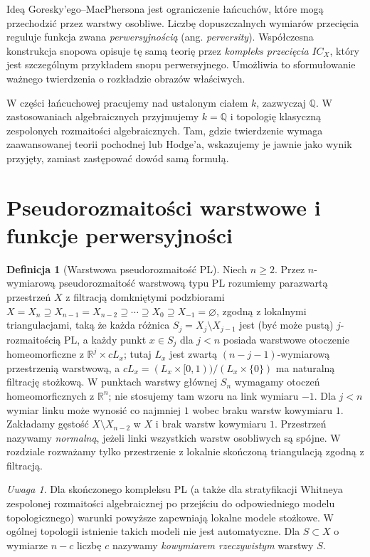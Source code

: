 \documentclass[11pt,a4paper,oneside]{report}
\newcommand{\R}{\mathbb{R}}
\newcommand{\Q}{\mathbb{Q}}
\theoremstyle{plain}
\theoremstyle{definition}
\newtheorem{definicja}[twierdzenie]{Definicja}
\theoremstyle{remark}
\newtheorem{uwaga}[twierdzenie]{Uwaga}
\begin{document}
Ideą Goresky'ego--MacPhersona jest ograniczenie łańcuchów, które
mogą przechodzić przez warstwy osobliwe. Liczbę dopuszczalnych
wymiarów przecięcia reguluje funkcja zwana
\emph{perwersyjnością} (ang. \emph{perversity}).
Współczesna konstrukcja snopowa opisuje tę samą teorię przez
\emph{kompleks przecięcia} $IC_X$, który jest szczególnym
przykładem snopu perwersyjnego. Umożliwia to sformułowanie
ważnego twierdzenia o rozkładzie obrazów właściwych.

W części łańcuchowej pracujemy nad ustalonym ciałem $k$,
zazwyczaj $\Q$. W zastosowaniach algebraicznych
przyjmujemy $k=\Q$ i topologię klasyczną zespolonych
rozmaitości algebraicznych. Tam, gdzie twierdzenie wymaga
zaawansowanej teorii pochodnej lub Hodge'a, wskazujemy je
jawnie jako wynik przyjęty, zamiast zastępować dowód samą
formułą.

\section{Pseudorozmaitości warstwowe i funkcje perwersyjności}
\begin{definicja}[Warstwowa pseudorozmaitość PL]
\label{def:pseudomanifold-xiii}
Niech $n\ge2$. Przez $n$-wymiarową pseudorozmaitość
warstwową typu PL rozumiemy parazwartą przestrzeń $X$
z filtracją domkniętymi podzbiorami
$X=X_n\supseteq X_{n-1}=X_{n-2}\supseteq\cdots\supseteq X_0
\supseteq X_{-1}=\varnothing$, zgodną z lokalnymi
triangulacjami, taką że każda różnica
$S_j=X_j\setminus X_{j-1}$ jest (być może pustą)
$j$-rozmaitością PL, a każdy punkt $x\in S_j$ dla $j<n$ posiada
warstwowe otoczenie homeomorficzne z
$\R^j\times cL_x$; tutaj $L_x$ jest zwartą
$(n-j-1)$-wymiarową przestrzenią warstwową,
a $cL_x=(L_x\times[0,1))/(L_x\times\{0\})$
ma naturalną filtrację stożkową. W punktach warstwy
głównej $S_n$ wymagamy otoczeń homeomorficznych
z $\R^n$; nie stosujemy tam wzoru na link
wymiaru $-1$. Dla $j<n$ wymiar linku może wynosić
co najmniej $1$ wobec braku warstw kowymiaru $1$. Zakładamy gęstość
$X\setminus X_{n-2}$ w $X$ i brak warstw kowymiaru $1$.
Przestrzeń nazywamy \emph{normalną}, jeżeli linki
wszystkich warstw osobliwych są spójne. W rozdziale
rozważamy tylko przestrzenie z lokalnie skończoną
triangulacją zgodną z filtracją.
\end{definicja}
\begin{uwaga}
Dla skończonego kompleksu PL (a także dla stratyfikacji
Whitneya zespolonej rozmaitości algebraicznej po przejściu
do odpowiedniego modelu topologicznego) warunki powyższe
zapewniają lokalne modele stożkowe. W ogólnej topologii
istnienie takich modeli nie jest automatyczne.
Dla $S\subset X$ o wymiarze $n-c$ liczbę $c$ nazywamy
\emph{kowymiarem rzeczywistym} warstwy $S$.
\end{uwaga}
\end{document}

